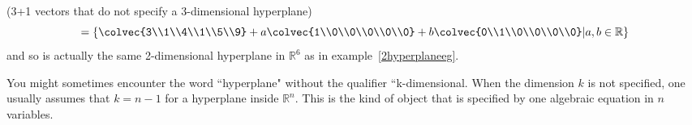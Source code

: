 \begin{example}{(3+1 vectors that do not specify a  3-dimensional hyperplane)}
\[=
\left\{ \colvec{3\\1\\4\\1\\5\\9} + a\colvec{1\\0\\0\\0\\0\\0} + b\colvec{0\\1\\0\\0\\0\\0} \middle\arrowvert a,b \in \mathbb{R} \right\}\] 
and so is actually the same 2-dimensional hyperplane in $\mathbb{R}^6$  as in example~\ref{2hyperplaneeg}.
\end{example}
















You might sometimes encounter the word ``hyperplane" without the qualifier ``k-dimensional. 
When the dimension $k$ is not specified, one usually assumes that $k=n-1$ for a hyperplane inside ${\mathbb R}^n$. This is the kind of object that is specified by one algebraic equation in $n$ variables. 

